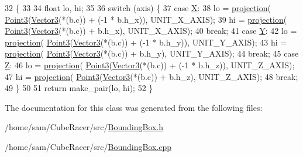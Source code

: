 \begin{DoxyCode}
32                                                                                     \{
33 
34   \textcolor{keywordtype}{float} lo, hi;
35 
36   \textcolor{keywordflow}{switch} (axis) \{
37   \textcolor{keywordflow}{case} \hyperlink{BoundingBox_8h_ac79c9040b19c90137f1ae7604877f1d8a58833a3110c570fb05130d40c365d1e4}{X}:
38     lo  = \hyperlink{namespaceVectormath_1_1Aos_a936875ce20a59d623f0010b431581d98}{projection}( \hyperlink{classVectormath_1_1Aos_1_1Point3}{Point3}(\hyperlink{classVectormath_1_1Aos_1_1Vector3}{Vector3}(*(b.c)) + (-1 * b.h\_x)), UNIT\_X\_AXIS);
39     hi  = \hyperlink{namespaceVectormath_1_1Aos_a936875ce20a59d623f0010b431581d98}{projection}( \hyperlink{classVectormath_1_1Aos_1_1Point3}{Point3}(\hyperlink{classVectormath_1_1Aos_1_1Vector3}{Vector3}(*(b.c)) + b.h\_x), UNIT\_X\_AXIS);
40     \textcolor{keywordflow}{break};
41   \textcolor{keywordflow}{case} \hyperlink{BoundingBox_8h_ac79c9040b19c90137f1ae7604877f1d8a5596231eabd6cf29050967d5ac83ad84}{Y}:
42     lo  = \hyperlink{namespaceVectormath_1_1Aos_a936875ce20a59d623f0010b431581d98}{projection}( \hyperlink{classVectormath_1_1Aos_1_1Point3}{Point3}(\hyperlink{classVectormath_1_1Aos_1_1Vector3}{Vector3}(*(b.c)) + (-1 * b.h\_y)), UNIT\_Y\_AXIS);
43     hi  = \hyperlink{namespaceVectormath_1_1Aos_a936875ce20a59d623f0010b431581d98}{projection}( \hyperlink{classVectormath_1_1Aos_1_1Point3}{Point3}(\hyperlink{classVectormath_1_1Aos_1_1Vector3}{Vector3}(*(b.c)) + b.h\_y), UNIT\_Y\_AXIS);
44     \textcolor{keywordflow}{break};
45   \textcolor{keywordflow}{case} \hyperlink{BoundingBox_8h_ac79c9040b19c90137f1ae7604877f1d8aa70478ce277ffc322f8e1e3418e07355}{Z}:
46     lo  = \hyperlink{namespaceVectormath_1_1Aos_a936875ce20a59d623f0010b431581d98}{projection}( \hyperlink{classVectormath_1_1Aos_1_1Point3}{Point3}(\hyperlink{classVectormath_1_1Aos_1_1Vector3}{Vector3}(*(b.c)) + (-1 * b.h\_z)), UNIT\_Z\_AXIS);
47     hi  = \hyperlink{namespaceVectormath_1_1Aos_a936875ce20a59d623f0010b431581d98}{projection}( \hyperlink{classVectormath_1_1Aos_1_1Point3}{Point3}(\hyperlink{classVectormath_1_1Aos_1_1Vector3}{Vector3}(*(b.c)) + b.h\_z), UNIT\_Z\_AXIS);
48     \textcolor{keywordflow}{break};
49   \}
50 
51   \textcolor{keywordflow}{return} make\_pair(lo, hi);
52 \}
\end{DoxyCode}


The documentation for this class was generated from the following files\-:\begin{DoxyCompactItemize}
\item 
/home/sam/\-Cube\-Racer/src/\hyperlink{BoundingBox_8h}{Bounding\-Box.\-h}\item 
/home/sam/\-Cube\-Racer/src/\hyperlink{BoundingBox_8cpp}{Bounding\-Box.\-cpp}\end{DoxyCompactItemize}
